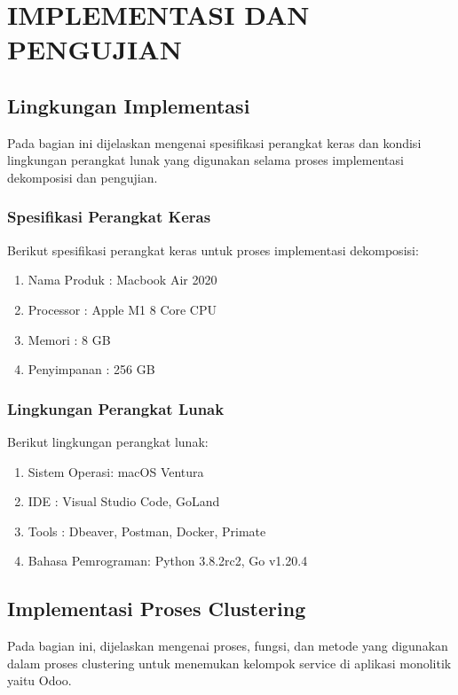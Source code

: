\chapter{IMPLEMENTASI DAN PENGUJIAN}

\vspace{4.5pt}

\section{Lingkungan Implementasi}
Pada bagian ini dijelaskan mengenai spesifikasi perangkat keras dan kondisi lingkungan perangkat lunak yang digunakan selama proses implementasi dekomposisi dan pengujian.\\

\subsection{Spesifikasi Perangkat Keras}
Berikut spesifikasi perangkat keras untuk proses implementasi dekomposisi:

\begin{enumerate}[leftmargin=1.3cm]
	\item Nama Produk : Macbook Air 2020 
	\item Processor : Apple M1 8 Core CPU
	\item Memori : 8 GB
	\item Penyimpanan : 256 GB \\
\end{enumerate}


\subsection{Lingkungan Perangkat Lunak}
Berikut lingkungan perangkat lunak:

\begin{enumerate}[leftmargin=1.3cm]
	\item Sistem Operasi: macOS Ventura
	\item IDE : Visual Studio Code, GoLand 
	\item Tools : Dbeaver, Postman, Docker, Primate
	\item Bahasa Pemrograman: Python 3.8.2rc2, Go v1.20.4 \\
\end{enumerate}

\section{Implementasi Proses Clustering}
Pada bagian ini, dijelaskan mengenai proses, fungsi, dan metode yang digunakan dalam proses clustering untuk menemukan kelompok service di aplikasi monolitik yaitu Odoo.

